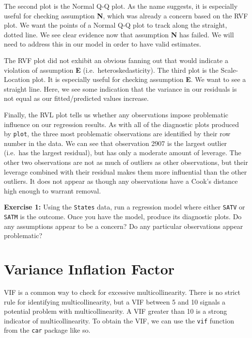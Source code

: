 \documentclass[
]{book}
\newenvironment{rmdblock}[1]
  {\begin{shaded*}
  }
  {\end{shaded*}
  }
\newenvironment{learncheck}
  {\begin{rmdblock}{warning}}
  {\end{rmdblock}}
\begin{document}
The second plot is the Normal Q-Q plot. As the name suggests, it is especially useful for checking assumption \textbf{N}, which was already a concern based on the RVF plot. We want the points of a Normal Q-Q plot to track along the straight, dotted line. We see clear evidence now that assumption \textbf{N} has failed. We will need to address this in our model in order to have valid estimates.

The RVF plot did not exhibit an obvious fanning out that would indicate a violation of assumption \textbf{E} (i.e.~heteroskedasticity). The third plot is the Scale-Location plot. It is especially useful for checking assumption \textbf{E}. We want to see a straight line. Here, we see some indication that the variance in our residuals is not equal as our fitted/predicted values increase.

Finally, the RVL plot tells us whether any observations impose problematic influence on our regression results. As with all of the diagnostic plots produced by \texttt{plot}, the three most problematic observations are identified by their row number in the data. We can see that observation 2907 is the largest outlier (i.e.~has the largest residual), but has only a moderate amount of leverage. The other two observations are not as much of outliers as other observations, but their leverage combined with their residual makes them more influential than the other outliers. It does not appear as though any observations have a Cook's distance high enough to warrant removal.

\begin{learncheck}
\textbf{Exercise 1:} Using the \texttt{States} data, run a regression
model where either \texttt{SATV} or \texttt{SATM} is the outcome. Once
you have the model, produce its diagnostic plots. Do any assumptions
appear to be a concern? Do any particular observations appear
problematic?
\end{learncheck}

\hypertarget{variance-inflation-factor}{%
\section{Variance Inflation Factor}\label{variance-inflation-factor}}

VIF is a common way to check for excessive multicollinearity. There is no strict rule for identifying multicollinearity, but a VIF between 5 and 10 signals a potential problem with multicollinearity. A VIF greater than 10 is a strong indicator of multicollinearity. To obtain the VIF, we can use the \texttt{vif} function from the \texttt{car} package like so.
\end{document}
